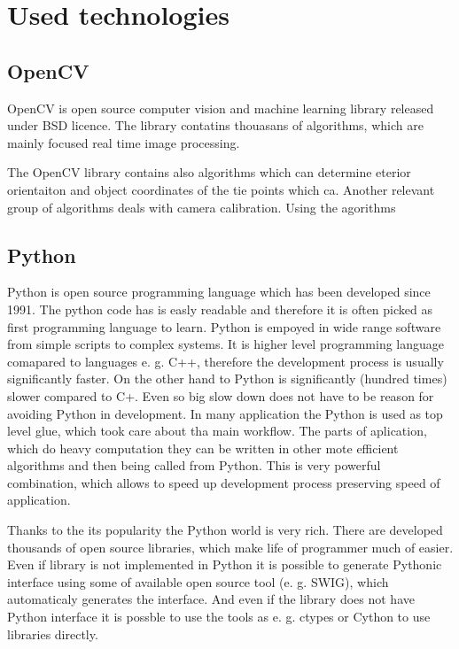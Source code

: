 \documentclass[a4paper,12pt]{report}
\begin{document}
\section{Used technologies}

\subsection{OpenCV}

OpenCV is open source computer vision and machine learning library released under BSD licence. 
The library contatins thouasans of algorithms, which are mainly focused real time image processing.


The OpenCV library contains also algorithms which can determine eterior orientaiton and object coordinates 
of the tie points which ca. 
Another relevant group of algorithms deals with camera calibration. Using the agorithms

\subsection{Python}

Python is open source programming language which has been developed since 1991. 
The python code has is easly readable and therefore it is often picked as first programming
language to learn. Python is empoyed in wide range software from simple scripts to complex systems.
It is higher level programming language comapared to languages e. g. C++, therefore 
the development process is usually significantly faster. On the other hand 
to Python is significantly (hundred times) slower compared to C+. Even so big 
slow down does not have to be reason for avoiding Python in development. 
In many application the Python is used as top level glue, which took care about 
tha main workflow. The parts of aplication, which do heavy computation  they can 
be written in other mote efficient algorithms and then being called 
from Python. This is very powerful combination, which allows to speed up development 
process preserving speed of application.

Thanks to the its popularity the Python world is very rich. There are developed
thousands of open source libraries, which make life of programmer much of easier. Even 
if library is not implemented in Python it is possible to generate Pythonic 
interface using some of available open source tool (e. g. SWIG), which automaticaly
generates the interface. And even if the library does not have Python interface it 
is possble to use the tools as e. g. ctypes or Cython to use libraries directly.
\end{document}
